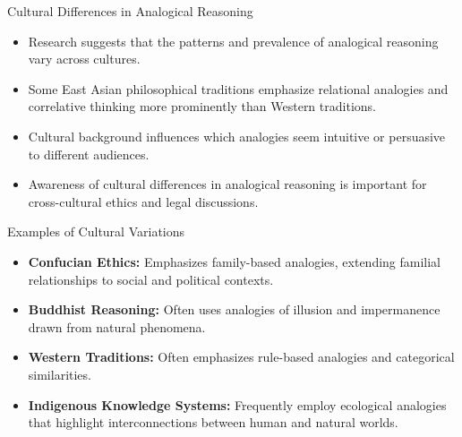 \documentclass{beamer}
\begin{document}
\begin{frame}{Cultural Differences in Analogical Reasoning}
	\begin{itemize}
		\item Research suggests that the patterns and prevalence of analogical reasoning vary across cultures.
		\item Some East Asian philosophical traditions emphasize relational analogies and correlative thinking more prominently than Western traditions.
		\item Cultural background influences which analogies seem intuitive or persuasive to different audiences.
		\item Awareness of cultural differences in analogical reasoning is important for cross-cultural ethics and legal discussions.
	\end{itemize}
	
	\begin{block}{Examples of Cultural Variations}
		\scriptsize
		\begin{itemize}
			\item \textbf{Confucian Ethics:} Emphasizes family-based analogies, extending familial relationships to social and political contexts.
			\item \textbf{Buddhist Reasoning:} Often uses analogies of illusion and impermanence drawn from natural phenomena.
			\item \textbf{Western Traditions:} Often emphasizes rule-based analogies and categorical similarities.
			\item \textbf{Indigenous Knowledge Systems:} Frequently employ ecological analogies that highlight interconnections between human and natural worlds.
		\end{itemize}
	\end{block}
\end{frame}
\end{document}
